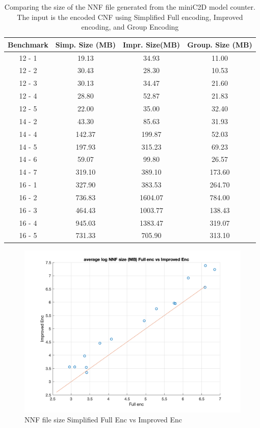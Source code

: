 \begin{table}[]
    \centering
    \begin{tabular}{c|c c c}
    \hline
    Benchmark	&	Simp. Size (MB)	&	Impr. Size(MB)	&	Group. Size (MB)	\\
    \hline
    \hline
    12	-	1	&	19.13	&	34.93	&	11.00	\\
    12	-	2	&	30.43	&	28.30	&	10.53	\\
    12	-	3	&	30.13	&	34.47	&	21.60	\\
    12	-	4	&	28.80	&	52.87	&	21.83	\\
    12	-	5	&	22.00	&	35.00	&	32.40	\\
    14	-	2	&	43.30	&	85.63	&	31.93	\\
    14	-	4	&	142.37	&	199.87	&	52.03	\\
    14	-	5	&	197.93	&	315.23	&	69.23	\\
    14	-	6	&	59.07	&	99.80	&	26.57	\\
    14	-	7	&	319.10	&	389.10	&	173.60	\\
    16	-	1	&	327.90	&	383.53	&	264.70	\\
    16	-	2	&	736.83	&	1604.07	&	784.00	\\
    16	-	3	&	464.43	&	1003.77	&	138.43	\\
    16	-	4	&	945.03	&	1383.47	&	319.07	\\
    16	-	5	&	731.33	&	705.90	&	313.10	\\
    \hline
    \end{tabular}
    \caption{Comparing the size of the NNF file generated from the miniC2D model counter. The input is the encoded CNF using Simplified Full encoding, Improved encoding, and Group Encoding}
    \label{tab:size compare}
\end{table}

\begin{figure}
    \centering
    \includegraphics[width = 0.7 \textwidth]{pic/Size_fullvsImproved.png}
    \caption{NNF file size Simplified Full Enc vs Improved Enc}
    \label{fig:filesize_enc1v2}
\end{figure}


